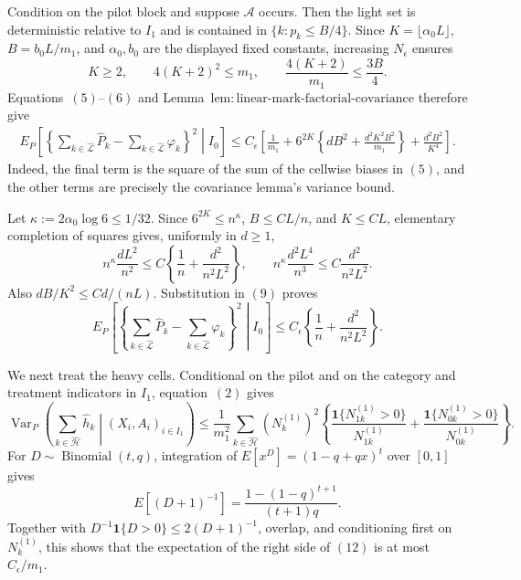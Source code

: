 Condition on the pilot block and suppose \(\mathcal A\) occurs.  Then the light set is deterministic relative to \(I_1\) and is contained in \(\{k:p_k\le B/4\}\).  Since \(K=\lfloor\alpha_0L\rfloor\), \(B=b_0L/m_1\), and \(\alpha_0,b_0\) are the displayed fixed constants, increasing \(N_{\epsilon}\) ensures
\[
 K\ge2,\qquad 4(K+2)^2\le m_1,\qquad
 \frac{4(K+2)}{m_1}\le\frac{3B}{4}.
\tag{8}
\]
Equations~\((5)\)--\((6)\) and Lemma~\(\mathrm{lem:linear\text{-}mark\text{-}factorial\text{-}covariance}\) therefore give
\[
\begin{split}
 E_P\left[\left\{
 \sum_{k\in\widehat{\mathcal L}}\widehat P_k-
 \sum_{k\in\widehat{\mathcal L}}\varphi_k
 \right\}^2\middle|I_0\right]
 \le C_{\epsilon}\left[
 \frac1{m_1}+6^{2K}\left\{dB^2+
 \frac{d^2K^2B^2}{m_1}\right\}
 +\frac{d^2B^2}{K^4}
 \right].
\end{split}
\tag{9}
\]
Indeed, the final term is the square of the sum of the cellwise biases in \((5)\), and the other terms are precisely the covariance lemma's variance bound.

Let \(\kappa:=2\alpha_0\log6\le1/32\).  Since \(6^{2K}\le n^\kappa\), \(B\le CL/n\), and \(K\le CL\), elementary completion of squares gives, uniformly in \(d\ge1\),
\[
 n^\kappa\frac{dL^2}{n^2}
 \le C\left\{\frac1n+\frac{d^2}{n^2L^2}\right\},
 \qquad
 n^\kappa\frac{d^2L^4}{n^3}
 \le C\frac{d^2}{n^2L^2}.
\tag{10}
\]
Also \(dB/K^2\le Cd/(nL)\).  Substitution in \((9)\) proves
\[
 E_P\left[\left\{
 \sum_{k\in\widehat{\mathcal L}}\widehat P_k-
 \sum_{k\in\widehat{\mathcal L}}\varphi_k
 \right\}^2\middle|I_0\right]
 \le C_{\epsilon}\left\{\frac1n+
 \frac{d^2}{n^2L^2}\right\}.
\tag{11}
\]

We next treat the heavy cells.  Conditional on the pilot and on the category and treatment indicators in \(I_1\), equation~\((2)\) gives
\[
 \operatorname{Var}_P\left(
 \sum_{k\in\widehat{\mathcal H}}\widehat h_k
 \middle|(X_i,A_i)_{i\in I_1}\right)
 \le\frac1{m_1^2}\sum_{k\in\widehat{\mathcal H}}(N_k^{(1)})^2
 \left\{
 \frac{\mathbf1\{N_{1k}^{(1)}>0\}}{N_{1k}^{(1)}}+
 \frac{\mathbf1\{N_{0k}^{(1)}>0\}}{N_{0k}^{(1)}}
 \right\}.
\tag{12}
\]
For \(D\sim\operatorname{Binomial}(t,q)\), integration of \(E[x^D]=(1-q+qx)^t\) over \([0,1]\) gives
\[
 E[(D+1)^{-1}]=\frac{1-(1-q)^{t+1}}{(t+1)q}.
\]
Together with \(D^{-1}\mathbf1\{D>0\}\le2(D+1)^{-1}\), overlap, and conditioning first on \(N_k^{(1)}\), this shows that the expectation of the right side of \((12)\) is at most \(C_{\epsilon}/m_1\).

